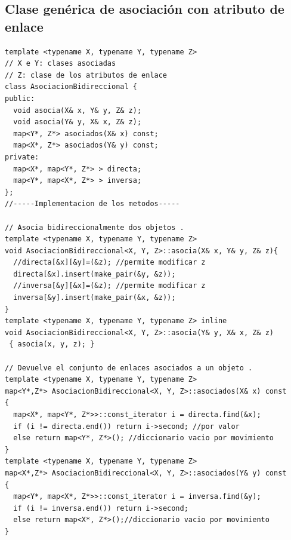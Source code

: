 \subsection{Clase genérica de asociación con atributo de enlace}
\begin{center}
	\begin{lstlisting}[frame=single]
template <typename X, typename Y, typename Z> 
// X e Y: clases asociadas
// Z: clase de los atributos de enlace
class AsociacionBidireccional {
public:
  void asocia(X& x, Y& y, Z& z);
  void asocia(Y& y, X& x, Z& z);
  map<Y*, Z*> asociados(X& x) const;
  map<X*, Z*> asociados(Y& y) const;
private:
  map<X*, map<Y*, Z*> > directa;
  map<Y*, map<X*, Z*> > inversa;
};
//-----Implementacion de los metodos-----

// Asocia bidireccionalmente dos objetos .
template <typename X, typename Y, typename Z>
void AsociacionBidireccional<X, Y, Z>::asocia(X& x, Y& y, Z& z){
  //directa[&x][&y]=(&z); //permite modificar z
  directa[&x].insert(make_pair(&y, &z));
  //inversa[&y][&x]=(&z); //permite modificar z
  inversa[&y].insert(make_pair(&x, &z));
}
template <typename X, typename Y, typename Z> inline
void AsociacionBidireccional<X, Y, Z>::asocia(Y& y, X& x, Z& z)
 { asocia(x, y, z); }
 
// Devuelve el conjunto de enlaces asociados a un objeto .
template <typename X, typename Y, typename Z>
map<Y*,Z*> AsociacionBidireccional<X, Y, Z>::asociados(X& x) const
{
  map<X*, map<Y*, Z*>>::const_iterator i = directa.find(&x);
  if (i != directa.end()) return i->second; //por valor
  else return map<Y*, Z*>(); //diccionario vacio por movimiento
}
template <typename X, typename Y, typename Z>
map<X*,Z*> AsociacionBidireccional<X, Y, Z>::asociados(Y& y) const
{
  map<Y*, map<X*, Z*>>::const_iterator i = inversa.find(&y);
  if (i != inversa.end()) return i->second;
  else return map<X*, Z*>();//diccionario vacio por movimiento
}
\end{lstlisting}
\end{center}